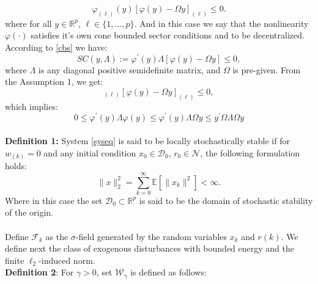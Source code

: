 \documentclass[conference]{IEEEtran}
\begin{document}
\begin{equation}\label{cbs}
\varphi_{(\ell)}(y)[\varphi(y)-\varOmega y ]_{(\ell)}\leq 0.
\end{equation}
where for all $y\in\mathbb{R}^{p}$, $\ell \in\{1,\dots,p\}$. And in this case we say that the nonlinearity $\varphi(\cdot) $ satisfies it's own cone bounded sector conditions and to be decentralized. According to \eqref{cbs} we have:
\begin{equation}\label{scieq}
	SC(y,\varLambda):= \varphi^{\mathrm{'}}(y)\varLambda[\varphi(y)-\varOmega y]\leq0,
\end{equation}
where $\varLambda$ is any diagonal positive semidefinite matrix, and $\varOmega$ is pre-given. From the Assumption 1, we get:
\begin{equation}
[\varOmega y]_{(\ell)}[\varphi(y)-\varOmega y]_{(\ell)}\leq0,
\end{equation}
which implies:
\begin{equation}
 0\leq\varphi^{\mathrm{'}}(y)\varLambda\varphi(y) \leq \varphi^{\mathrm{'}}(y)\varLambda\varOmega y \leq y^{\mathrm{'}}\varOmega\varLambda\varOmega y
\end{equation}\\
\textbf{Definition 1:} System \eqref{syseq} is said to be locally stochastically stable if for $w_(k)=0$ and any initial condition $x_0\in \mathcal{D}_0$, $r_0\in \mathcal{N}$, the following formulation holds:
\begin{equation}
	\|x\|^2_2=\sum_{k=0}^{\infty}\mathbb{E}[\|x_k\|^2]<\infty.
\end{equation} 
Where in this case the set $\mathcal{D}_0 \subset \mathbb{R}^{p}$ is said to be the domain of stochastic stability of the origin. \\
\\
Define $\mathcal{F}_k$ as the $\sigma$-field generated by the random variables $x_k$ and $r(k)$. We define next the class of exogenous disturbances with bounded energy and the finite $\ell_2$-induced norm.
\\
\textbf{Definition 2}: For $\gamma>0$, set $\mathcal{W}_{\gamma}$ is defined as follows:
\end{document}
